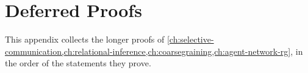 \chapter{Deferred Proofs}
\label{app:deferred-proofs}

This appendix collects the longer proofs of \cref{ch:selective-communication,ch:relational-inference,ch:coarsegraining,ch:agent-network-rg}, in the order of the statements they prove.





